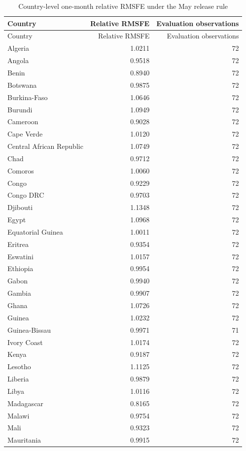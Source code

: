 \begin{longtable}{lrr}
\caption{Country-level one-month relative RMSFE under the May release rule}\label{tab:supp_country}\\
\toprule
Country & Relative RMSFE & Evaluation observations \\
\midrule
\endfirsthead
\toprule
Country & Relative RMSFE & Evaluation observations \\
\midrule
\endhead
Algeria & 1.0211 & 72 \\
Angola & 0.9518 & 72 \\
Benin & 0.8940 & 72 \\
Botswana & 0.9875 & 72 \\
Burkina-Faso & 1.0646 & 72 \\
Burundi & 1.0949 & 72 \\
Cameroon & 0.9028 & 72 \\
Cape Verde & 1.0120 & 72 \\
Central African Republic & 1.0749 & 72 \\
Chad & 0.9712 & 72 \\
Comoros & 1.0060 & 72 \\
Congo & 0.9229 & 72 \\
Congo DRC & 0.9703 & 72 \\
Djibouti & 1.1348 & 72 \\
Egypt & 1.0968 & 72 \\
Equatorial Guinea & 1.0011 & 72 \\
Eritrea & 0.9354 & 72 \\
Eswatini & 1.0157 & 72 \\
Ethiopia & 0.9954 & 72 \\
Gabon & 0.9940 & 72 \\
Gambia & 0.9907 & 72 \\
Ghana & 1.0726 & 72 \\
Guinea & 1.0232 & 72 \\
Guinea-Bissau & 0.9971 & 71 \\
Ivory Coast & 1.0174 & 72 \\
Kenya & 0.9187 & 72 \\
Lesotho & 1.1125 & 72 \\
Liberia & 0.9879 & 72 \\
Libya & 1.0116 & 72 \\
Madagascar & 0.8165 & 72 \\
Malawi & 0.9754 & 72 \\
Mali & 0.9323 & 72 \\
Mauritania & 0.9915 & 72 \\

\end{longtable}
